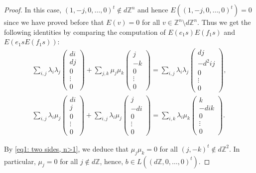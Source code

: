 \documentclass[12pt]{amsart}
\theoremstyle{definition}
\theoremstyle{remark}
\begin{document}
\begin{proof}
In this case, $(1,-j,0,\ldots,0)^t\not\in d\mathbb{Z}^n$ and hence $ E((1,-j,0,\ldots,0)^t)=0$ since we have proved before that $E(v)=0$ for all $v\in \mathbb{Z}^n\setminus {d\mathbb{Z}^n}$. Thus we get the following identities by comparing the computation of $E(e_1s)E(f_1s)$ and $E(e_1sE(f_1s))$:
\begin{align}
\label{eq1: two sides, n>1} \sum_{i, j}\lambda_i\lambda_j\left(\begin{smallmatrix}
di\\
dj\\
0\\
\vdots\\
0
\end{smallmatrix}\right)+\sum_{j, k}\mu_j\mu_k\left(\begin{smallmatrix}
j\\
-k\\
0\\
\vdots\\
0
\end{smallmatrix}\right)=\sum_{i,j}\lambda_i\lambda_j\left(\begin{smallmatrix}
dj\\
-d^2ij\\
0\\
\vdots\\
0
\end{smallmatrix}\right),\\
\label{eq2: two sides, n>1}\sum_{i,j}\lambda_i\mu_j\left(\begin{smallmatrix}
di\\
j\\
0\\
\vdots\\
0
\end{smallmatrix}\right)+\sum_{i, j}\lambda_i\mu_j\left(\begin{smallmatrix}
j\\
-di\\
0\\
\vdots\\
0
\end{smallmatrix}\right)=\sum_{i, k}\lambda_i\mu_k\left(\begin{smallmatrix}
k\\
-dik\\
0\\
\vdots\\
0
\end{smallmatrix}\right).
\end{align}

By \eqref{eq1: two sides, n>1}, we deduce that $\mu_j\mu_k=0$ for all $(j,-k)^t\not\in d\mathbb{Z}^2$. In particular, $\mu_j=0$ for all $j\not\in d\mathbb{Z}$, hence, $b\in L((d\mathbb{Z}, 0,\dots,0)^t)$.




\end{proof}
\end{document}
